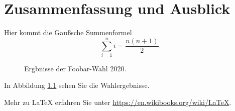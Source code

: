 \chapter{Zusammenfassung und Ausblick}\label{chap:summary}

Hier kommt die Gaußsche Summenformel
\[
\sum_{i=1}^n i = \frac{n(n+1)}{2}.
\]


\begin{figure}[th]
  \centering
{}
\caption{Ergbnisse der Foobar-Wahl 2020.}\label{fig:wahl2020}
\end{figure}

In Abbildung \ref{fig:wahl2020} sehen Sie die Wahlergebnisse.


Mehr zu \LaTeX\xspace erfahren Sie unter
\url{https://en.wikibooks.org/wiki/LaTeX}.
